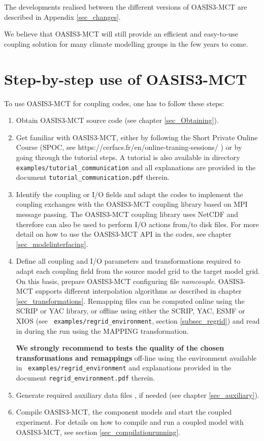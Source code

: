 The developments realised between the different versions of OASIS3-MCT are described in Appendix \ref{sec_changes}.

We believe that OASIS3-MCT will still provide an efficient and
easy-to-use coupling solution for many climate modelling groups in the few years to come. 


\section{Step-by-step use of OASIS3-MCT}

To use OASIS3-MCT for coupling codes, one has to follow these steps:
\begin{enumerate}
\item Obtain OASIS3-MCT source code (see chapter \ref{sec_Obtaining}).
\item Get familiar with OASIS3-MCT, either by following the Short Private Online Course (SPOC, see  https://cerfacs.fr/en/online-traning-sessions/ ) or by going through the tutorial steps. A tutorial is also available in directory {\tt
  examples/tutorial\_communication} and all explanations are provided in the document
{\tt tutorial\_communication.pdf} therein.

\item Identify the coupling or I/O fields and adapt the codes to
  implement the coupling exchanges with the OASIS3-MCT coupling library based on MPI message passing.
  The OASIS3-MCT coupling library uses NetCDF and therefore can also be used to perform I/O actions
  from/to disk files.  For more detail on how to use the 
  OASIS3-MCT API in the codes, see chapter \ref{sec_modelinterfacing}.

\item Define all coupling and I/O parameters and transformations
  required to adapt each coupling field from the source model grid to
  the target model grid. On this basis, prepare OASIS3-MCT configuring file 
  {\it namcouple}.
  OASIS3-MCT supports different interpolation algorithms as described in
  chapter \ref{sec_transformations}.  Remapping files can be computed
  online using the SCRIP or YAC library, or offline using either the SCRIP, YAC, ESMF or XIOS (see  {\tt
  examples/regrid\_environment}, section \ref{subsec_regrid}) and read in during the run using the MAPPING
  transformation.

{\bf We strongly recommend to tests the quality of the chosen transformations and remappings} off-line using the environment available in {\tt
  examples/regrid\_environment} and explanations provided in the document {\tt regrid\_environment.pdf} therein. 

\item Generate required auxiliary data files , if needed (see chapter
  \ref{sec_auxiliary}).
\item Compile OASIS3-MCT, the component models and start the coupled
  experiment. For details on how to compile and run a coupled model
  with OASIS3-MCT, see section \ref{sec_compilationrunning}. 

\end{enumerate}

